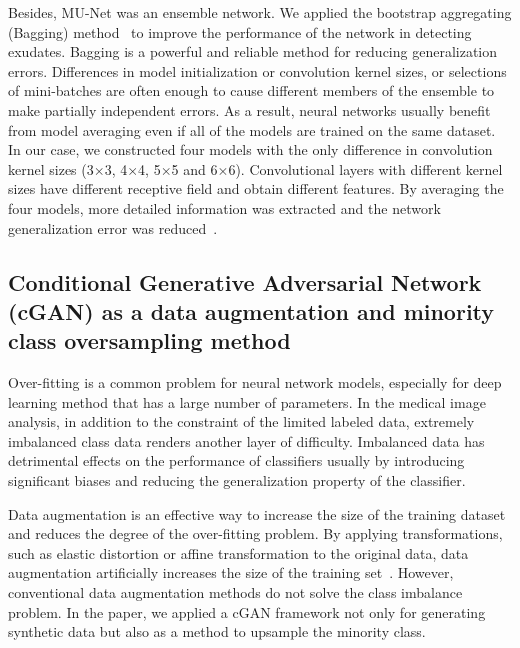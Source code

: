 \documentclass{osa-article}
\begin{document}
Besides, MU-Net was an ensemble network. We applied the bootstrap aggregating (Bagging) method~\cite{breiman1996bagging} to improve the performance of the network in detecting exudates. Bagging is a powerful and reliable method for reducing generalization errors. Differences in model initialization or convolution kernel sizes, or selections of mini-batches are often enough to cause different members of the ensemble to make partially independent errors. As a result, neural networks usually benefit from model averaging even if all of the models are trained on the same dataset. In our case,  we constructed four models with the only difference in convolution kernel sizes (3$\times$3, 4$\times$4, 5$\times$5 and 6$\times$6). Convolutional layers with different kernel sizes have different receptive field and obtain different features. By averaging the four models, more detailed information was extracted and the network generalization error was reduced~\cite{lecun2015deep}.


\subsection{Conditional Generative Adversarial Network (cGAN) as a data augmentation and minority class oversampling method}

Over-fitting is a common problem for neural network models, especially for deep learning method that has a large number of parameters. In the medical image analysis, in addition to the constraint of the limited labeled data, extremely imbalanced class data renders another layer of difficulty. Imbalanced data has detrimental effects on the performance of classifiers usually by introducing significant biases and reducing the generalization property of the classifier. 

Data augmentation is an effective way to increase the size of the training dataset and reduces the degree of the over-fitting problem. By applying transformations, such as elastic distortion or affine transformation to the original data, data augmentation artificially increases the size of the training set~\cite{zhu2016adversarial}. However, conventional data augmentation methods do not solve the class imbalance problem. In the paper, we applied a cGAN framework not only for generating synthetic data but also as a method to upsample the minority class.
\end{document}
